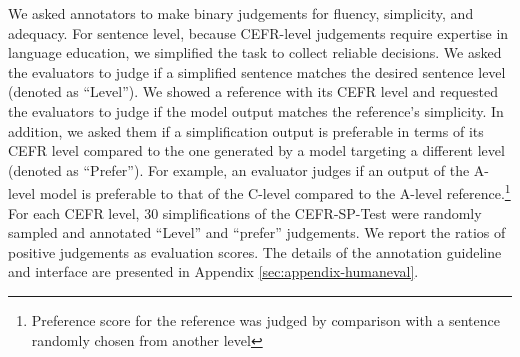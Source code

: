We asked annotators to make binary judgements for fluency, simplicity, and adequacy. 
For sentence level, because CEFR-level judgements require expertise in language education, we simplified the task to collect reliable decisions. %
We asked the evaluators to judge if a simplified sentence matches the desired sentence level (denoted as ``Level''). 
We showed a reference with its CEFR level and requested the evaluators to judge if the model output matches the reference's simplicity. 
In addition, we asked them if a simplification output is preferable in terms of its CEFR level compared to the one generated by a model targeting a different level (denoted as ``Prefer''). 
For example, an evaluator judges if an output of the A-level model is preferable to that of the C-level compared to the A-level reference.\footnote{Preference score for the reference was judged by comparison with a sentence randomly chosen from another level} 
For each CEFR level, $30$ simplifications of the CEFR-SP-Test were randomly sampled and annotated ``Level'' and ``prefer'' judgements. 
We report the ratios of positive judgements as evaluation scores. 
The details of the annotation guideline and interface are presented in Appendix \ref{sec:appendix-humaneval}. 



